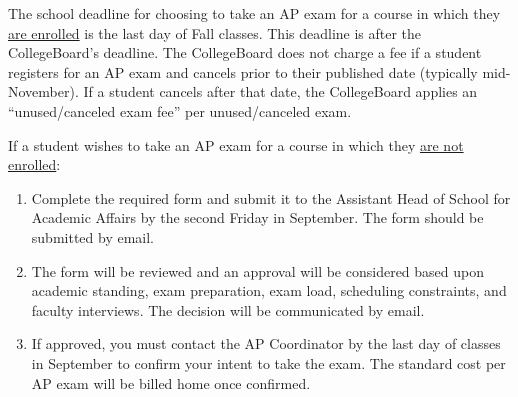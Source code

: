 \begin{enumerate}
  The school deadline  for choosing to take an  AP exam for a course in which they \underline{are enrolled} is the last day of Fall classes.  This deadline is after the CollegeBoard's deadline.  The CollegeBoard does not charge a fee if a student registers for an AP exam and cancels prior to their published date (typically mid-November).  If a student cancels after that date, the CollegeBoard applies an ``unused/canceled exam fee'' per unused/canceled exam.  
  
  If a student wishes to take an AP exam for a course in which  they \underline{are not enrolled}:
  
  \begin{enumerate}
    \item Complete the required form and submit it to the Assistant Head of School for Academic Affairs by the second Friday in September. The form should be submitted by email.
    \item The form will be reviewed and an approval will be considered based upon academic standing, exam preparation, exam load, scheduling constraints, and faculty interviews. The decision will be communicated by email.
    \item  If approved, you must contact the AP Coordinator by the last day of classes in September to confirm your intent to take the exam. The standard cost per AP exam will be billed home once confirmed. 
  \end{enumerate}






  

\end{enumerate}






